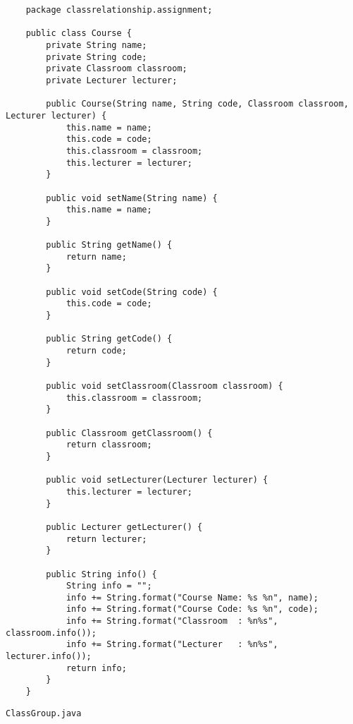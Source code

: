 \documentclass[12pt,titlepage]{article}
\begin{document}
\begin{verbatim}
    package classrelationship.assignment;

    public class Course {
        private String name;
        private String code;
        private Classroom classroom;
        private Lecturer lecturer;

        public Course(String name, String code, Classroom classroom, Lecturer lecturer) {
            this.name = name;
            this.code = code;
            this.classroom = classroom;
            this.lecturer = lecturer;
        }

        public void setName(String name) {
            this.name = name;
        }

        public String getName() {
            return name;
        }

        public void setCode(String code) {
            this.code = code;
        }

        public String getCode() {
            return code;
        }

        public void setClassroom(Classroom classroom) {
            this.classroom = classroom;
        }

        public Classroom getClassroom() {
            return classroom;
        }

        public void setLecturer(Lecturer lecturer) {
            this.lecturer = lecturer;
        }

        public Lecturer getLecturer() {
            return lecturer;
        }

        public String info() {
            String info = "";
            info += String.format("Course Name: %s %n", name);
            info += String.format("Course Code: %s %n", code);
            info += String.format("Classroom  : %n%s", classroom.info());
            info += String.format("Lecturer   : %n%s", lecturer.info());
            return info;
        }
    }
\end{verbatim}
\texttt{ClassGroup.java}
\end{document}
